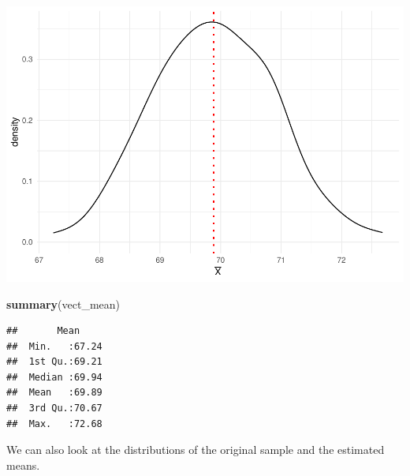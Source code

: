 \documentclass[
]{article}
\newenvironment{Shaded}{\begin{snugshade}}{\end{snugshade}}
\newcommand{\FunctionTok}[1]{\textcolor[rgb]{0.13,0.29,0.53}{\textbf{#1}}}
\newcommand{\NormalTok}[1]{#1}
\begin{document}
\includegraphics{Estimation-and-Confidence-intervals_files/figure-latex/unnamed-chunk-4-1.pdf}

\begin{Shaded}
\begin{Highlighting}[]
\FunctionTok{summary}\NormalTok{(vect\_mean)}
\end{Highlighting}
\end{Shaded}

\begin{verbatim}
##       Mean      
##  Min.   :67.24  
##  1st Qu.:69.21  
##  Median :69.94  
##  Mean   :69.89  
##  3rd Qu.:70.67  
##  Max.   :72.68
\end{verbatim}

We can also look at the distributions of the original sample and the
estimated means.
\end{document}
